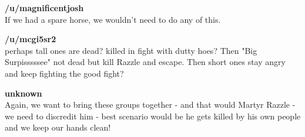 \textbf{/u/magnificentjosh}\\
If we had a spare horse, we wouldn't need to do any of this.\medskip

\textbf{/u/mcgi5sr2}\\
perhaps tall ones are dead? killed in fight with dutty hoes? Then "Big Surpisssssee" not dead but kill Razzle and escape. Then short ones stay angry and keep fighting the good fight?\medskip

\textbf{unknown}\\
Again, we want to bring these groups together - and that would Martyr Razzle - we need to discredit him - best scenario would be he gets killed by his own people and we keep our hands clean!\medskip

\vspace*{5mm}
